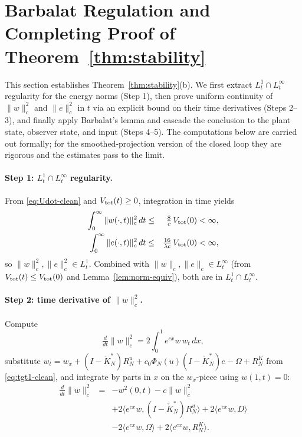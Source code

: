 \documentclass[journal,twoside,web]{ieeecolor}
\begin{document}
\section{Barbalat Regulation and Completing Proof of Theorem~\ref{thm:stability}}\label{sec:proof-Barbalat}

This section establishes Theorem~\ref{thm:stability}(b). We first extract $L^1_t\cap L^\infty_t$ regularity for the energy norms (Step 1), then prove uniform continuity of $\|w\|_c^2$ and $\|e\|_c^2$ in $t$ via an explicit bound on their time derivatives (Steps 2--3), and finally apply Barbalat's lemma and cascade the conclusion to the plant state, observer state, and input (Steps 4--5). The computations below are carried out formally; for the smoothed-projection version of the closed loop they are rigorous and the estimates pass to the limit.

\paragraph{Step 1: $L^1_t\cap L^\infty_t$ regularity.}
From \eqref{eq:Udot-clean} and $V_{\rm tot}(t)\ge 0$, integration in time yields
\begin{eqnarray}
\int_0^\infty\|w(\cdot,t)\|_c^2\,dt &\le& \tfrac{8}{c}\,V_{\rm tot}(0)<\infty, \nonumber\\
\int_0^\infty\|e(\cdot,t)\|_c^2\,dt &\le& \tfrac{16}{\lambda c}\,V_{\rm tot}(0)<\infty, \label{eq:we-L2t}
\end{eqnarray}
so $\|w\|_c^2,\|e\|_c^2\in L^1_t$. Combined with $\|w\|_c,\|e\|_c\in L^\infty_t$ (from $V_{\rm tot}(t)\le V_{\rm tot}(0)$ and Lemma~\ref{lem:norm-equiv}), both are in $L^1_t\cap L^\infty_t$.

\paragraph{Step 2: time derivative of $\|w\|_c^2$.}
Compute
\begin{equation}\label{eq:ddt-w-c2}
\tfrac{d}{dt}\|w\|_c^2=2\int_0^1\!e^{cx}w\,w_t\,dx,
\end{equation}
substitute $w_t=w_x+(I-\check K_N^*)R^u_N+c_0\Phi_N(u)(I-\check K_N^*)e-\Omega+R^K_N$ from \eqref{eq:tgt1-clean}, and integrate by parts in $x$ on the $w_x$-piece using $w(1,t)=0$:
\begin{eqnarray}
\tfrac{d}{dt}\|w\|_c^2 &=& -w^2(0,t)-c\|w\|_c^2 \nonumber\\
&& +2\langle e^{cx}w,(I-\check K_N^*)R^u_N\rangle+2\langle e^{cx}w,D\rangle \nonumber\\
&& -2\langle e^{cx}w,\Omega\rangle+2\langle e^{cx}w,R^K_N\rangle. \label{eq:ddt-w-c2-expanded}
\end{eqnarray}
\end{document}
